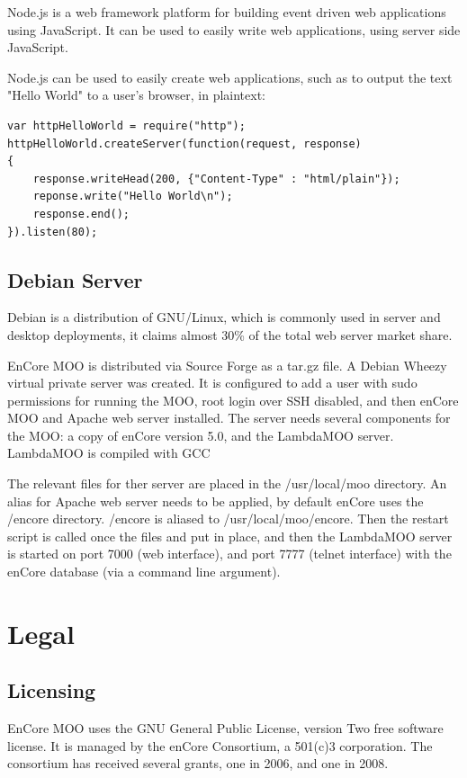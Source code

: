 \documentclass[12pt, letterpaper]{report}
\begin{document}
\par
Node.js is a web framework platform for building event driven web applications using JavaScript. It can be used to easily write web applications, using server side JavaScript.
	
\par
Node.js can be used to easily create web applications, such as to output the text "Hello World" to a user's browser, in plaintext:

\begin{lstlisting}
var httpHelloWorld = require("http");
httpHelloWorld.createServer(function(request, response)
{
    response.writeHead(200, {"Content-Type" : "html/plain"});
    reponse.write("Hello World\n");
    response.end();
}).listen(80);
\end{lstlisting}


\section{Debian Server}
\par
Debian is a distribution of GNU/Linux, which is commonly used in server and desktop deployments, it claims almost 30\% of the total web server market share.

\par 
EnCore MOO is distributed via Source Forge as a tar.gz file. A Debian Wheezy virtual private server was created. It is configured to add a user with sudo permissions for running the MOO, root login over SSH disabled, and then enCore MOO and Apache web server installed. The server needs several components for the MOO: a copy of enCore version 5.0, and the LambdaMOO server. LambdaMOO is compiled with GCC

\par
The relevant files for ther server are placed in the /usr/local/moo directory. An alias for Apache web server needs to be applied, by default enCore uses the /encore directory. /encore is aliased to /usr/local/moo/encore. Then the restart script is called once the files and put in place, and then the LambdaMOO server is started on port 7000 (web interface), and port 7777 (telnet interface) with the enCore database (via a command line argument).
	
\chapter{Legal}
\section{Licensing}
\par
EnCore MOO uses the GNU General Public License, version Two free software license. It is managed by the enCore Consortium, a 501(c)3 corporation. The consortium has received several grants, one in 2006, and one in 2008.
\end{document}
